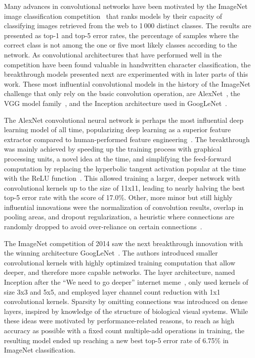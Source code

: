 \documentclass[english,twoside,openright]{UH_DS_MSc}
\begin{document}
Many advances in convolutional networks have been motivated by the ImageNet image classification competition~\cite{imagenet}
 that ranks models by their capacity of classifying images retrieved from the web to 1\,000 distinct classes.
 The results are presented as top-1 and top-5 error rates, the percentage of samples 
where the correct class is not among the one or five most likely classes according to the network. As convolutional architectures
that have performed well in the competition have been found valuable in handwritten character classification, the 
breakthrough models presented next are experimented with in later parts of this work.
These most influential convolutional models in the history of the ImageNet challenge  that
only rely on the basic convolution operation, are AlexNet~\cite{alexnet}, 
the VGG model family~\cite{vgg}, and
the Inception architecture used in GoogLeNet~\cite{googlelenet}.

The AlexNet convolutional neural network is perhaps the most influential deep learning model of all time, 
popularizing deep learning as a superior feature extractor compared to human-performed feature engineering~\cite{princebook}.
The breakthrough was mainly achieved by speeding up the training process with graphical processing units, a novel idea at the time, and simplifying the feed-forward computation by replacing the
hyperbolic tangent activation popular at the time with the ReLU function~\cite{alexnet}.
 This allowed training a larger, deeper network
with convolutional kernels up to the size of 11x11, leading to nearly halving the best top-5 error rate with the score of
17.0\%. Other, more minor but still highly influential innovations were the normalization of convolution results, 
overlap in pooling areas, and dropout regularization, a heuristic where connections are randomly dropped to avoid over-reliance on certain connections~\cite{dropout}.

The ImageNet competition of 2014 saw the next breakthrough innovation with the winning architecture GoogLeNet~\cite{googlelenet}. The authors
introduced smaller convolutional kernels with highly optimized training computation that allow deeper,
and therefore more capable networks. The layer architecture, named Inception after the ``We 
need to go deeper'' internet meme~\cite{we_need_to_go_deeper}, only used kernels of size 3x3 and 5x5, and
employed layer channel count reduction with 1x1 convolutional kernels. Sparsity by omitting connections was introduced on dense layers, inspired by knowledge of the structure of biological visual systems. While these ideas were motivated
by performance-related reasons, to reach as high accuracy as possible with a fixed count multiple-add operations in training, the resulting model ended up reaching a new best top-5 error rate of 6.75\%
in ImageNet classification.
\end{document}
